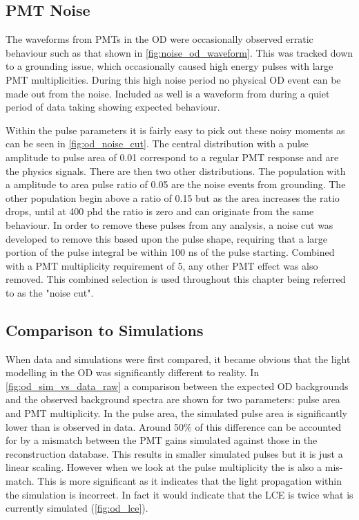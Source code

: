 \subsection{PMT Noise}
\par
The waveforms from PMTs in the OD were occasionally observed erratic behaviour such as that shown in \autoref{fig:noise_od_waveform}.
This was tracked down to a grounding issue, which occasionally caused high energy pulses with large PMT multiplicities.
During this high noise period no physical OD event can be made out from the noise.
Included as well is a waveform from during a quiet period of data taking showing expected behaviour.



\par
Within the pulse parameters it is fairly easy to pick out these noisy moments as can be seen in \autoref{fig:od_noise_cut}.
The central distribution with a pulse amplitude to pulse area of 0.01 correspond to a regular PMT response and are the physics signals.
There are then two other distributions.
The population with a amplitude to area pulse ratio of 0.05 are the noise events from grounding.
The other population begin above a ratio of 0.15 but as the area increases the ratio drops, until at 400 phd the ratio is zero and can originate from the same behaviour.
In order to remove these pulses from any analysis, a noise cut was developed to remove this based upon the pulse shape, requiring that a large portion of the pulse integral be within 100 ns of the pulse starting.
Combined with a PMT multiplicity requirement of 5, any other PMT effect was also removed.
This combined selection is used throughout this chapter being referred to as the "noise cut".

\subsection{Comparison to Simulations}
\par

When data and simulations were first compared, it became obvious that the light modelling in the OD was significantly different to reality.
In \autoref{fig:od_sim_vs_data_raw} a comparison between the expected OD backgrounds and the observed background spectra are shown for two parameters: pulse area and PMT multiplicity.
In the pulse area, the simulated pulse area is significantly lower than is observed in data.
Around 50\% of this difference can be accounted for by a mismatch between the PMT gains simulated against those in the reconstruction database.
This results in smaller simulated pulses but it is just a linear scaling.
However when we look at the pulse multiplicity the is also a mis-match.
This is more significant as it indicates that the light propagation within the simulation is incorrect.
In fact it would indicate that the LCE is twice what is currently simulated (\autoref{fig:od_lce}).

